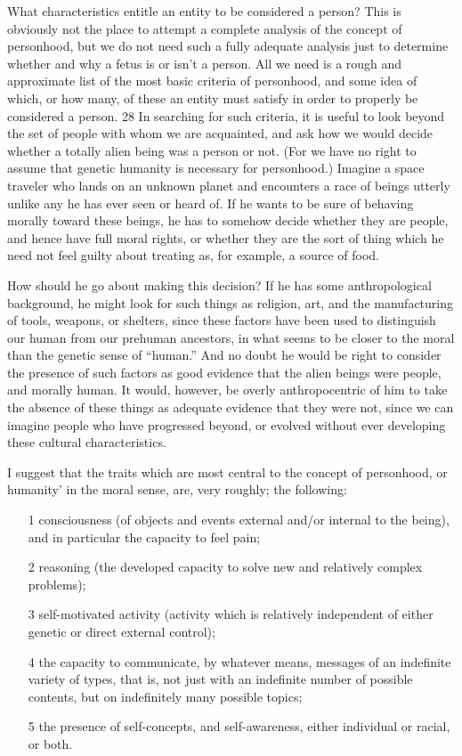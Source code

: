 What characteristics entitle an entity to be considered a
person? This is obviously not the place to attempt a
complete analysis of the concept of personhood, but we
do not need such a fully adequate analysis just to
determine whether and why a fetus is or isn’t a person.
All we need is a rough and approximate list of the most
basic criteria of personhood, and some idea of which, or
how many, of these an entity must satisfy in order to
properly be considered a person.
28 In searching for such criteria, it is useful to look beyond
the set of people with whom we are acquainted, and ask
how we would decide whether a totally alien being was a
person or not. (For we have no right to assume that
genetic humanity is necessary for personhood.) Imagine a
space traveler who lands on an unknown planet and
encounters a race of beings utterly unlike any he has ever
seen or heard of. If he wants to be sure of behaving
morally toward these beings, he has to somehow decide
whether they are people, and hence have full moral rights,
or whether they are the sort of thing which he need not
feel guilty about treating as, for example, a source of
food.

How should he go about making this decision? If he has
some anthropological background, he might look for such
things as religion, art, and the manufacturing of tools,
weapons, or shelters, since these factors have been used to
distinguish our human from our prehuman ancestors, in
what seems to be closer to the moral than the genetic
sense of “human.” And no doubt he would be right to
consider the presence of such factors as good evidence
that the alien beings were people, and morally human. It
would, however, be overly anthropocentric of him to take
the absence of these things as adequate evidence that they
were not, since we can imagine people who have
progressed beyond, or evolved without ever developing
these cultural characteristics.

I suggest that the traits which are most central to the
concept of personhood, or humanity’ in the moral sense,
are, very roughly; the following:

\begin{enumerate}
\item[1] consciousness (of objects and events external
and/or internal to the being), and in particular the
capacity to feel pain;
\item[2] reasoning (the developed capacity to solve new and
relatively complex problems);
\item[3] self-motivated activity (activity which is relatively
independent of either genetic or direct external
control);
\item[4] the capacity to communicate, by whatever means,
messages of an indefinite variety of types, that is, not
just with an indefinite number of possible contents,
but on indefinitely many possible topics;
\item[5] the presence of self-concepts, and self-awareness,
either individual or racial, or both.
\end{enumerate}

